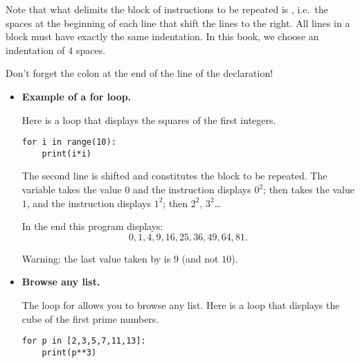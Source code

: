 \documentclass[11pt,class=report,crop=false]{standalone}
\begin{document}
\begin{cours}





Note that what delimits the block of instructions to be repeated is , i.e.~the spaces at the beginning of each line that shift the lines to the right.
All lines in a block must have exactly the same indentation. In this book, we choose an indentation of $4$ spaces.

Don't forget the colon \og{}\ci{:}\fg{} at the end of the line of the  declaration!

\begin{itemize}
  \item \textbf{Example of a \og{}for\fg{} loop.}

Here is a loop that displays the squares of the first integers. 
\begin{center}
\begin{minipage}{0.5\textwidth} 
\begin{lstlisting}
for i in range(10):
    print(i*i)
\end{lstlisting}
\end{minipage}
\end{center} 
The second line is shifted and constitutes the block to be repeated.
The variable  takes the value $0$ and the instruction displays $0^2$;
then  takes the value $1$, and the instruction displays $1^2$; then $2^2$, $3^2$\ldots

In the end this program displays:
$$0,1,4,9,16,25,36,49,64,81.$$

Warning: the last value taken by  is $9$ (and not $10$).

  \item \textbf{Browse any list.}
  
The loop \og{}for\fg{} allows you to browse any list. Here is a loop that displays the cube of the first prime numbers.
\begin{center}
\begin{minipage}{0.5\textwidth} 
\begin{lstlisting}
for p in [2,3,5,7,11,13]:
    print(p**3)
\end{lstlisting}
\end{minipage}
\end{center} 


\end{itemize}
\end{cours}
\end{document}
